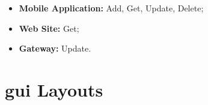 \begin{itemize}
	\item \textbf{Mobile Application:} Add, Get, Update, Delete;
	\item \textbf{Web Site:} Get;
	\item \textbf{Gateway:} Update.	
\end{itemize}

\clearpage
\section{\ac{gui} Layouts}




